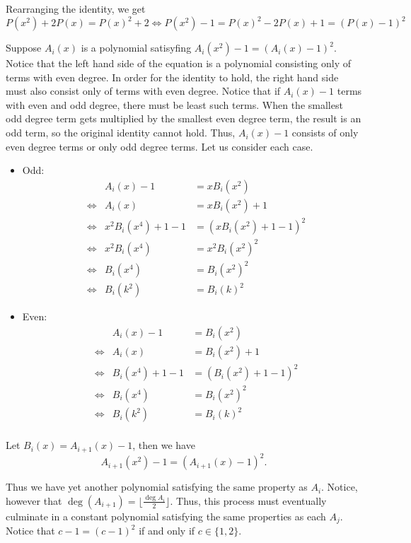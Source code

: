 \documentclass{article}
\begin{document}
\begin{enumerate}
Rearranging the identity, we get
$$P(x^2) + 2P(x) = {P(x)}^2 + 2 \iff P(x^2) - 1 = {P(x)}^2 - 2P(x) + 1 = (P(x) - 1)^2$$

Suppose $A_i(x)$ is a polynomial satisyfing $A_i(x^2) - 1 = (A_i(x) - 1)^2$. Notice that the left hand side of the equation is a polynomial consisting only of terms with even degree. In order for the identity to hold, the right hand side must also consist only of terms with even degree. Notice that if $A_i(x) - 1$ terms with even and odd degree, there must be least such terms. When the smallest odd degree term gets multiplied by the smallest even degree term, the result is an odd term, so the original identity cannot hold. Thus, $A_i(x) - 1$ consists of only even degree terms or only odd degree terms. Let us consider each case.
\begin{itemize}
    \item Odd: 
    \begin{align*}
        & &A_i(x) - 1 &= x B_{i}(x^2) \\
        &\iff &A_i(x) &= xB_{i}(x^2) + 1 \\
        &\iff &x^2B_{i}(x^4) + 1 - 1 &= (xB_{i}(x^2) + 1 - 1)^2 \\
        &\iff &x^2B_{i}(x^4) &= x^2 {B_{i}(x^2)}^2 \\
        &\iff &B_{i}(x^4) &= {B_{i}(x^2)}^2 \\
        &\iff &B_{i}(k^2) &= {B_{i}(k)}^2
    \end{align*}
    \item Even:
    \begin{align*}
        & &A_i(x) - 1 &= B_{i}(x^2) \\
        &\iff &A_i(x) &= B_{i}(x^2) + 1 \\
        &\iff &B_{i}(x^4) + 1 - 1 &= (B_{i}(x^2) + 1 - 1)^2 \\
        &\iff &B_{i}(x^4) &= {B_{i}(x^2)}^2 \\
        &\iff &B_{i}(k^2) &= {B_{i}(k)}^2 \\
    \end{align*}
\end{itemize}

Let $B_{i}(x) = A_{i + 1}(x) - 1$, then we have 
$$A_{i + 1}(x^2) - 1 = (A_{i + 1}(x) - 1)^2.$$

Thus we have yet another polynomial satisfying the same property as $A_i$. Notice, however that $\deg(A_{i + 1}) = \lfloor \frac{\deg A_i}{2} \rfloor$. Thus, this process must eventually culminate in a constant polynomial satisfying the same properties as each $A_j$. Notice that $c - 1 = (c - 1)^2$ if and only if $c \in \{1, 2\}$.


\end{enumerate}
\end{document}
